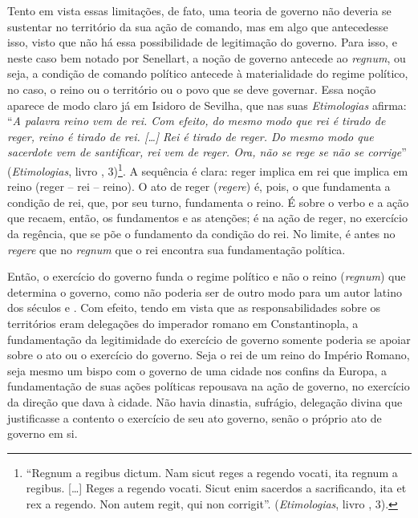 Tento em vista essas limitações, de fato, uma teoria de governo não
deveria se sustentar no território da sua ação de comando, mas em algo
que antecedesse isso, visto que não há essa possibilidade de legitimação
do governo. Para isso, e neste caso bem notado por Senellart, a noção de
governo antecede ao \emph{regnum}, ou seja, a condição de comando
político antecede à materialidade do regime político, no caso, o reino
ou o território ou o povo que se deve governar. Essa noção aparece de
modo claro já em Isidoro de Sevilha, que nas suas \emph{Etimologias}
afirma: ``\emph{A palavra reino vem de rei. Com efeito, do mesmo modo
que rei é tirado de reger, reino é tirado de rei. {[}\ldots{}{]} Rei é tirado
de reger. Do mesmo modo que sacerdote vem de santificar, rei vem de
reger. Ora, não se rege se não se corrige}'' (\emph{Etimologias}, livro
, 3)\footnote{``Regnum a regibus dictum. Nam sicut reges a regendo
  vocati, ita regnum a regibus. {[}\ldots{}{]} Reges a regendo vocati. Sicut
  enim sacerdos a sacrificando, ita et rex a regendo. Non autem regit,
  qui non corrigit''. (\emph{Etimologias}, livro , 3).}. A sequência é
clara: reger implica em rei que implica em reino (reger -- rei --
reino). O ato de reger (\emph{regere}) é, pois, o que fundamenta a
condição de rei, que, por seu turno, fundamenta o reino. É sobre o verbo
e a ação que recaem, então, os fundamentos e as atenções; é na ação de
reger, no exercício da regência, que se põe o fundamento da condição do
rei. No limite, é antes no \emph{regere} que no \emph{regnum} que o rei
encontra sua fundamentação política.

Então, o exercício do governo funda o regime político e não o reino
(\emph{regnum}) que determina o governo, como não poderia ser de outro
modo para um autor latino dos séculos  e . Com efeito, tendo em
vista que as responsabilidades sobre os territórios eram delegações do
imperador romano em Constantinopla, a fundamentação da legitimidade do
exercício de governo somente poderia se apoiar sobre o ato ou o
exercício do governo. Seja o rei de um reino do Império Romano, seja
mesmo um bispo com o governo de uma cidade nos confins da Europa, a
fundamentação de suas ações políticas repousava na ação de governo, no
exercício da direção que dava à cidade. Não havia dinastia, sufrágio,
delegação divina que justificasse a contento o exercício de seu ato
governo, senão o próprio ato de governo em si.

